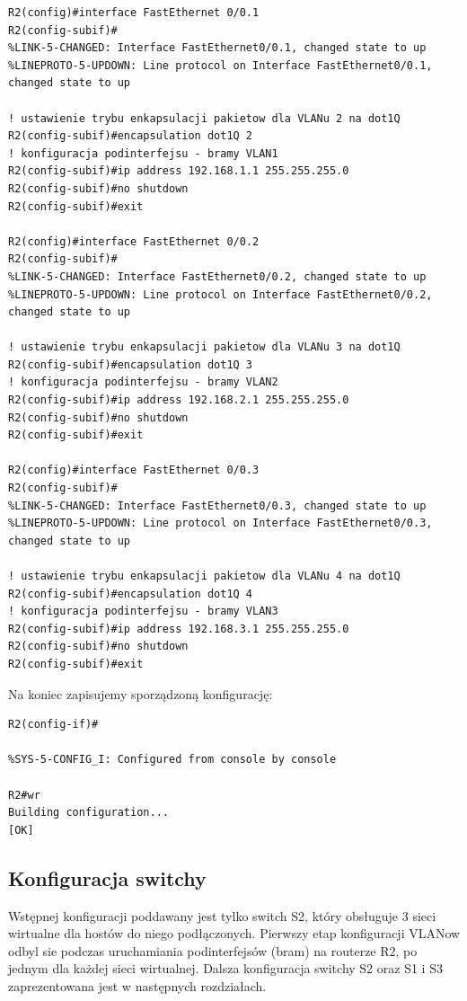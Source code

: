 \documentclass[polish,11pt,a4paper,twoside]{article}
\begin{document}
\begin{lstlisting}
R2(config)#interface FastEthernet 0/0.1
R2(config-subif)#
%LINK-5-CHANGED: Interface FastEthernet0/0.1, changed state to up
%LINEPROTO-5-UPDOWN: Line protocol on Interface FastEthernet0/0.1, changed state to up

! ustawienie trybu enkapsulacji pakietow dla VLANu 2 na dot1Q
R2(config-subif)#encapsulation dot1Q 2
! konfiguracja podinterfejsu - bramy VLAN1
R2(config-subif)#ip address 192.168.1.1 255.255.255.0
R2(config-subif)#no shutdown 
R2(config-subif)#exit

R2(config)#interface FastEthernet 0/0.2
R2(config-subif)#
%LINK-5-CHANGED: Interface FastEthernet0/0.2, changed state to up
%LINEPROTO-5-UPDOWN: Line protocol on Interface FastEthernet0/0.2, changed state to up

! ustawienie trybu enkapsulacji pakietow dla VLANu 3 na dot1Q
R2(config-subif)#encapsulation dot1Q 3
! konfiguracja podinterfejsu - bramy VLAN2
R2(config-subif)#ip address 192.168.2.1 255.255.255.0
R2(config-subif)#no shutdown 
R2(config-subif)#exit

R2(config)#interface FastEthernet 0/0.3
R2(config-subif)#
%LINK-5-CHANGED: Interface FastEthernet0/0.3, changed state to up
%LINEPROTO-5-UPDOWN: Line protocol on Interface FastEthernet0/0.3, changed state to up

! ustawienie trybu enkapsulacji pakietow dla VLANu 4 na dot1Q
R2(config-subif)#encapsulation dot1Q 4
! konfiguracja podinterfejsu - bramy VLAN3
R2(config-subif)#ip address 192.168.3.1 255.255.255.0
R2(config-subif)#no shutdown 
R2(config-subif)#exit
\end{lstlisting}
Na koniec zapisujemy sporządzoną konfigurację:
\begin{lstlisting}
R2(config-if)#

%SYS-5-CONFIG_I: Configured from console by console

R2#wr
Building configuration...
[OK]
\end{lstlisting}


\subsection{Konfiguracja switchy}
Wstępnej konfiguracji poddawany jest tylko switch S2, który obsługuje 3 sieci wirtualne dla hostów do niego podłączonych. Pierwszy etap konfiguracji VLANow odbyl sie podczas uruchamiania podinterfejsów (bram) na routerze R2, po jednym dla każdej sieci wirtualnej.
Dalsza konfiguracja switchy S2 oraz S1 i S3 zaprezentowana jest w następnych rozdziałach.
\end{document}
